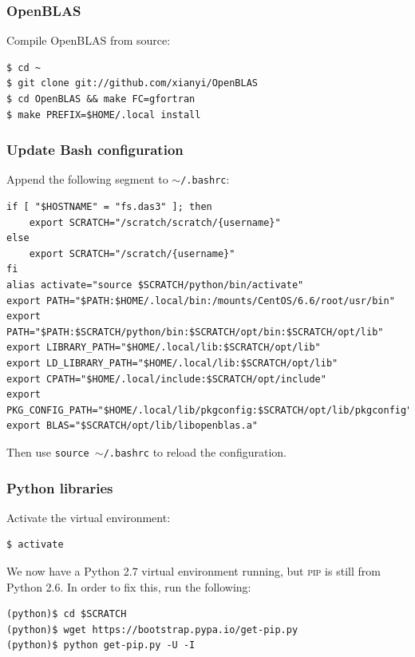 \documentclass{article}
\begin{document}
\subsubsection{OpenBLAS}\label{app:openblas}
Compile OpenBLAS from source:

\begin{verbatim}
$ cd ~
$ git clone git://github.com/xianyi/OpenBLAS
$ cd OpenBLAS && make FC=gfortran
$ make PREFIX=$HOME/.local install
\end{verbatim}

\subsubsection{Update Bash configuration}\label{app:update-bashrc}
Append the following segment to \texttt{$\sim$/.bashrc}:

\begin{verbatim}
if [ "$HOSTNAME" = "fs.das3" ]; then
    export SCRATCH="/scratch/scratch/{username}"
else
    export SCRATCH="/scratch/{username}"
fi
alias activate="source $SCRATCH/python/bin/activate"
export PATH="$PATH:$HOME/.local/bin:/mounts/CentOS/6.6/root/usr/bin"
export PATH="$PATH:$SCRATCH/python/bin:$SCRATCH/opt/bin:$SCRATCH/opt/lib"
export LIBRARY_PATH="$HOME/.local/lib:$SCRATCH/opt/lib"
export LD_LIBRARY_PATH="$HOME/.local/lib:$SCRATCH/opt/lib"
export CPATH="$HOME/.local/include:$SCRATCH/opt/include"
export PKG_CONFIG_PATH="$HOME/.local/lib/pkgconfig:$SCRATCH/opt/lib/pkgconfig"
export BLAS="$SCRATCH/opt/lib/libopenblas.a"
\end{verbatim}

Then use \texttt{source $\sim$/.bashrc} to reload the configuration.

\subsubsection{Python libraries}\label{app:python-libraries}
Activate the virtual environment:

\begin{verbatim}
$ activate
\end{verbatim}

We now have a Python 2.7 virtual environment running, but \textsc{pip} is still 
from Python 2.6. In order to fix this, run the following:

\begin{verbatim}
(python)$ cd $SCRATCH
(python)$ wget https://bootstrap.pypa.io/get-pip.py
(python)$ python get-pip.py -U -I
\end{verbatim}
\end{document}
